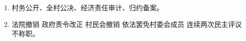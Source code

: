 \begin{enumerate}
\begin{enumerate}
\begin{enumerate}
                  \item 村委会成员。自生自灭。不得制定、委派、撤换。
                  \item 五村三代罢村委，幼儿园不干政。双过半。
                  \item 村民选举委员会。乡级政府来监督。
                \end{enumerate}
          \item 村务公开、全村公决、经济责任审计、归约备案。
          \item 法院撤销 \hz 政府责令改正 \hz 村民会撤销 \hz 依法罢免村委会成员 \hz 连续两次民主评议不称职。
        \end{enumerate}
\end{enumerate}
